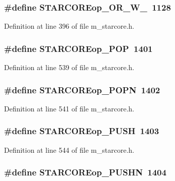 \subsubsection{\setlength{\rightskip}{0pt plus 5cm}\#define STARCOREop\_\-OR\_\-W\_~1128}\label{m__starcore_8h_d34792a164196d51129783747a892f83}




Definition at line 396 of file m\_\-starcore.h.
\subsubsection{\setlength{\rightskip}{0pt plus 5cm}\#define STARCOREop\_\-POP~1401}\label{m__starcore_8h_2e8adb98ed75e623189c9068ca0ba654}




Definition at line 539 of file m\_\-starcore.h.
\subsubsection{\setlength{\rightskip}{0pt plus 5cm}\#define STARCOREop\_\-POPN~1402}\label{m__starcore_8h_e02bcccb139eafa172edeceb384ee4fe}




Definition at line 541 of file m\_\-starcore.h.
\subsubsection{\setlength{\rightskip}{0pt plus 5cm}\#define STARCOREop\_\-PUSH~1403}\label{m__starcore_8h_02e404805a60a8ce151ffedfbfd572fc}




Definition at line 544 of file m\_\-starcore.h.
\subsubsection{\setlength{\rightskip}{0pt plus 5cm}\#define STARCOREop\_\-PUSHN~1404}\label{m__starcore_8h_4c7204163ee9805f786dfad400b0c1b6}




